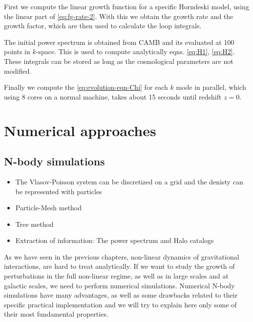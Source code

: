 First we compute the linear growth function for a specific Horndeski
model, using the linear part of \ref{eq:fg-rate-2}. With this we
obtain the growth rate and the growth factor, which are then used
to calculate the loop integrals.

The initial power spectrum is obtained from CAMB and its evaluated
at 100 points in $k$-space. This is used to compute analytically
eqns. \ref{eq:H1}, \ref{eq:H2}. These integrals can be stored as
long as the cosmological parameters are not modified.

Finally we compute the \ref{eq:evolution-eqn-Chi} for each $k$ mode
in parallel, which using 8 cores on a normal machine, takes about
15 seconds until redshift $z=0$.

\section{Numerical approaches}

\subsection{N-body simulations}
\begin{itemize}
\item The Vlasov-Poisson system can be discretized on a grid and the denisty
can be represented with particles
\item Particle-Mesh method
\item Tree method
\item Extraction of information: The power spectrum and Halo catalogs
\end{itemize}



As we have seen in the previous chapters, non-linear dynamics of gravitational
interactions, are hard to treat analytically. If we want to study
the growth of perturbations in the full non-linear regime, as well
as in large scales and at galactic scales, we need to perform numerical
simulations. Numerical N-body simulations have many advantages, as
well as some drawbacks related to their specific practical implementation
and we will try to explain here only some of their most fundamental
properties. 


